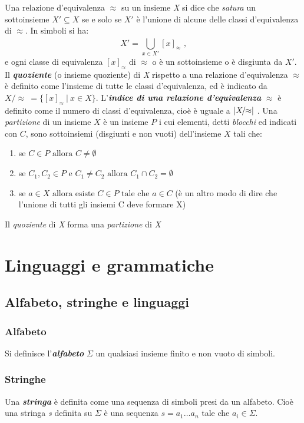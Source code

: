 Una relazione d'equivalenza $\approx$ su un insieme \textit{X} si dice che \textit{satura} un sottoinsieme $X' \subseteq X$ se e solo se $X'$ è l'unione di alcune delle classi d'equivalenza di $\approx$. In simboli si ha:
\begin{equation*}
X' = \bigcup_{x \in X'}^{}{\!\![x]_\approx} \text{ ,}
\end{equation*}
e ogni classe di equivalenza $[x]_\approx \text{ di } \approx$ o è un sottoinsieme o è disgiunta da $X'$.\\
Il \textbf{\textit{quoziente}} (o insieme quoziente) di \textit{X} rispetto a una relazione d'equivalenza $\approx$ è definito come l'insieme di tutte le classi d'equivalenza, ed è indicato da $X\!/\!\!\approx  \:=  \{[x]_\approx \: | \: x \in X \}$. L'\textbf{\textit{indice di una relazione d'equivalenza}} $\approx$ è definito come il numero di classi d'equivalenza, cioè è uguale a $\lvert X\!/\!\!\approx\rvert$ .
 Una \textit{partizione} di un insieme $X$ è un insieme $P$ i cui elementi, detti \textit{blocchi} ed indicati con $C$, sono sottoinsiemi (disgiunti e non vuoti) dell'insieme $X$ tali che: 
\begin{enumerate}
\item se $C \in P \text{ allora } C \ne \emptyset$
\item se $C_1,C_2 \in P \text{ e } C_1 \ne C_2 \text{ allora } C_1 \cap C_2  = \emptyset   $
\item se $a \in X \text{ allora esiste } C \in P \text{ tale che } a \in C$ (è un altro modo di dire che l'unione di tutti gli insiemi C deve formare X)
\end{enumerate}  
Il \textit{quoziente} di \textit{X} forma una \textit{partizione} di \textit{X}

\section{Linguaggi e grammatiche}
\subsection{Alfabeto, stringhe e linguaggi}
\subsubsection{Alfabeto}
Si definisce l'\textbf{\textit{alfabeto}} $\Sigma$ un qualsiasi insieme finito e non vuoto di simboli.

\subsubsection{Stringhe}
Una \textbf{\textit{stringa}} è definita come una sequenza di simboli presi da un alfabeto. Cioè una stringa \textit{s} definita su $\Sigma$ è una sequenza $ s = a_1\dots{}a_n$ tale che $a_i \in \Sigma$. 

